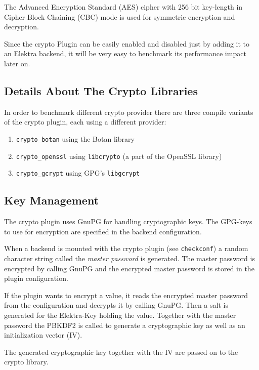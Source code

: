 The Advanced Encryption Standard (AES) cipher with 256 bit key-length in
Cipher Block Chaining (CBC) mode is used for symmetric encryption and
decryption.

Since the crypto Plugin can be easily enabled and disabled just by adding it to an Elektra backend,
it will be very easy to benchmark its performance impact later on.

\subsection{Details About The Crypto
Libraries}\label{details-about-the-crypto-libraries}

In order to benchmark different crypto provider there are three compile
variants of the crypto plugin, each using a different provider:

\begin{enumerate}
\def\labelenumi{\arabic{enumi}.}
\tightlist
\item
  \texttt{crypto\_botan} using the Botan library
\item
  \texttt{crypto\_openssl} using \texttt{libcrypto} (a part of the
  OpenSSL library)
\item
  \texttt{crypto\_gcrypt} using GPG's \texttt{libgcrypt}
\end{enumerate}

\subsection{Key Management}\label{key-management}

The crypto plugin uses GnuPG for handling cryptographic keys. The
GPG-keys to use for encryption are specified in the backend
configuration.

When a backend is mounted with the crypto plugin (see
\texttt{checkconf}) a random character string called the \emph{master
password} is generated. The master password is encrypted by calling
GnuPG and the encrypted master password is stored in the plugin
configuration.

If the plugin wants to encrypt a value, it reads the encrypted master
password from the configuration and decrypts it by calling GnuPG. Then a
salt is generated for the Elektra-Key holding the value. Together with
the master password the PBKDF2 is called to generate a cryptographic key
as well as an initialization vector (IV).

The generated cryptographic key together with the IV are passed on to
the crypto library.

